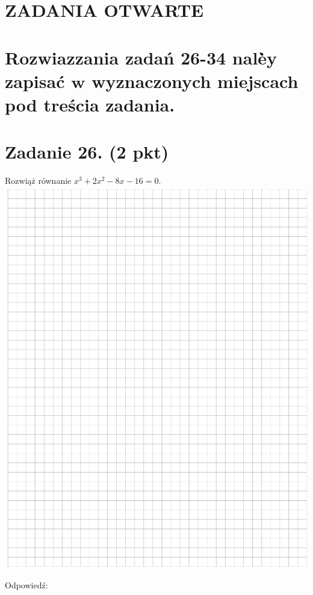 \documentclass[10pt]{article}
\begin{document}
\section*{ZADANIA OTWARTE}
\section*{Rozwiazzania zadań 26-34 nalè̇y zapisać \(\mathbf{w}\) wyznaczonych miejscach pod treścia zadania.}
\section*{Zadanie 26. (2 pkt)}
Rozwiąż równanie \(x^{3}+2 x^{2}-8 x-16=0\).\\
\includegraphics[max width=\textwidth, center]{2024_11_21_e0e8aab895018a50a9a7g-10}

Odpowiedź:
\end{document}
